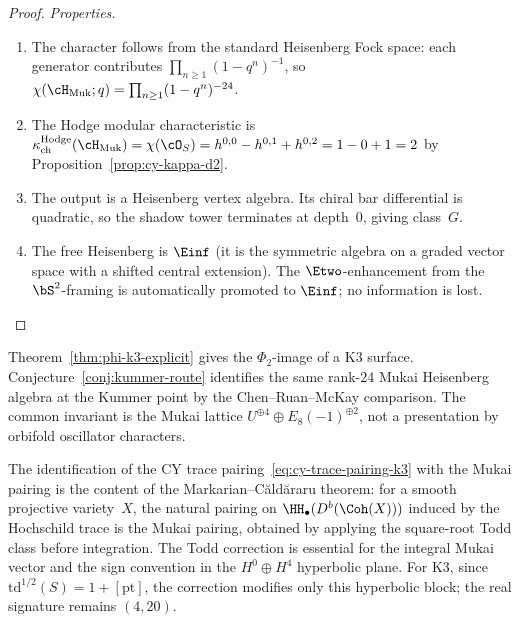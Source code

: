 \begin{proof}
\smallskip\noindent\emph{Properties.}
\begin{enumerate}[label=(\roman*)]
 \item The character follows from the standard Heisenberg Fock space: each generator contributes $\prod_{n \geq 1}(1 - q^n)^{-1}$, so $\chi(\cH_{\mathrm{Muk}}; q) = \prod_{n \geq 1}(1 - q^n)^{-24}$.
 \item The Hodge modular characteristic is $\kappa_{\mathrm{ch}}^{\mathrm{Hodge}}(\cH_{\mathrm{Muk}}) = \chi(\cO_S) = h^{0,0} - h^{0,1} + h^{0,2} = 1 - 0 + 1 = 2$ by Proposition~\ref{prop:cy-kappa-d2}.
 \item The output is a Heisenberg vertex algebra. Its chiral bar differential is quadratic, so the shadow tower terminates at depth~$0$, giving class~$G$.
 \item The free Heisenberg is $\Einf$ (it is the symmetric algebra on a graded vector space with a shifted central extension). The $\Etwo$-enhancement from the $\bS^2$-framing is automatically promoted to $\Einf$; no information is lost.
\end{enumerate}
\end{proof}

\begin{remark}
\label{rem:phi-k3-vs-kummer}
Theorem~\ref{thm:phi-k3-explicit} gives the \(\Phi_2\)-image of a K3
surface.  Conjecture~\ref{conj:kummer-route} identifies the same
rank-\(24\) Mukai Heisenberg algebra at the Kummer point by the
Chen--Ruan--McKay comparison.  The common invariant is the Mukai
lattice \(U^{\oplus4}\oplus E_8(-1)^{\oplus2}\), not a presentation by
orbifold oscillator characters.
\end{remark}

\begin{remark}
\label{rem:mukai-from-trace}
The identification of the CY trace pairing~\eqref{eq:cy-trace-pairing-k3} with the Mukai pairing is the content of the Markarian--C\u{a}ld\u{a}raru theorem: for a smooth projective variety~$X$, the natural pairing on $\HH_\bullet(D^b(\Coh(X)))$ induced by the Hochschild trace is the Mukai pairing, obtained by applying the square-root Todd class before integration. The Todd correction is essential for the integral Mukai vector and the sign convention in the \(H^0\oplus H^4\) hyperbolic plane. For K3, since $\mathrm{td}^{1/2}(S) = 1 + [\mathrm{pt}]$, the correction modifies only this hyperbolic block; the real signature remains \((4,20)\).
\end{remark}

